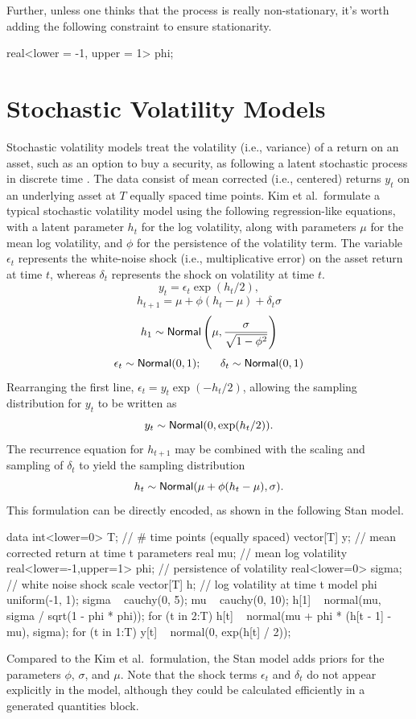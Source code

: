Further, unless one thinks that the process is really non-stationary,
it's worth adding the following constraint to ensure stationarity.
%
\begin{stancode}
real<lower = -1, upper = 1> phi;
\end{stancode}



\section{Stochastic Volatility Models}

Stochastic volatility models treat the volatility (i.e., variance) of
a return on an asset, such as an option to buy a security, as
following a latent stochastic process in discrete time
\citep{KimShephardChib:1998}.  The data consist of mean corrected
(i.e., centered) returns $y_t$ on an underlying asset at $T$ equally
spaced time points.  Kim et al.\ formulate a typical stochastic
volatility model using the following regression-like equations, with a
latent parameter $h_t$ for the log volatility, along with parameters
$\mu$ for the mean log volatility, and $\phi$ for the persistence of
the volatility term.  The variable $\epsilon_t$ represents the
white-noise shock (i.e., multiplicative error) on the asset return at
time $t$, whereas $\delta_t$ represents the shock on volatility at
time $t$.
\[
y_t = \epsilon_t \exp(h_t / 2),
\]
\[
h_{t+1} = \mu + \phi (h_t - \mu) + \delta_t \sigma
\]
\[
h_1 \sim \mbox{\sf Normal}\left( \mu, \frac{\sigma}{\sqrt{1 - \phi^2}} \right)
\]
\[
\epsilon_t \sim \distro{Normal}(0,1); \ \ \ \ \  \delta_t \sim \distro{Normal}(0,1)
\]
%
Rearranging the first line, $\epsilon_t = y_t \exp(-h_t / 2)$,
allowing the sampling distribution for $y_t$ to be written as
\[
y_t \sim \mbox{\sf Normal}(0,\exp(h_t/2)).
\]
The recurrence equation for $h_{t+1}$ may be combined with the
scaling and sampling of $\delta_t$ to yield the sampling distribution
\[
h_t \sim \mbox{\sf Normal}(\mu + \phi(h_t - \mu), \sigma).
\]
This formulation can be directly encoded, as shown in the following
Stan model.
%
\begin{stancode}
data {
  int<lower=0> T;   // # time points (equally spaced)
  vector[T] y;      // mean corrected return at time t
}
parameters {
  real mu;                     // mean log volatility
  real<lower=-1,upper=1> phi;  // persistence of volatility
  real<lower=0> sigma;         // white noise shock scale
  vector[T] h;                 // log volatility at time t
}
model {
  phi ~ uniform(-1, 1);
  sigma ~ cauchy(0, 5);
  mu ~ cauchy(0, 10);
  h[1] ~ normal(mu, sigma / sqrt(1 - phi * phi));
  for (t in 2:T)
    h[t] ~ normal(mu + phi * (h[t - 1] -  mu), sigma);
  for (t in 1:T)
    y[t] ~ normal(0, exp(h[t] / 2));
}
\end{stancode}
%
Compared to the Kim et al.\ formulation, the Stan model adds priors
for the parameters $\phi$, $\sigma$, and $\mu$.  Note that the shock
terms $\epsilon_t$ and $\delta_t$ do not appear explicitly in the
model, although they could be calculated efficiently in a generated
quantities block.


